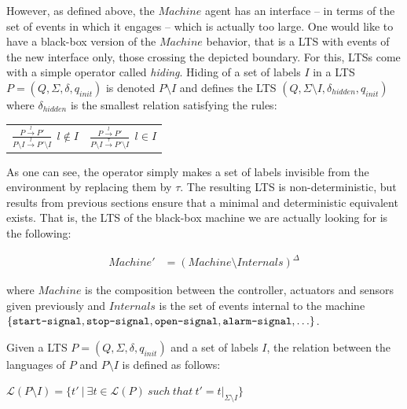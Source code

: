 However, as defined above, the $Machine$ agent has an interface -- in terms of the set of events in which it engages -- which is actually too large. One would like to have a black-box version of the $Machine$ behavior, that is a LTS with events of the new interface only, those crossing the depicted boundary. For this, LTSs come with a simple operator called \emph{hiding}. Hiding of a set of labels $I$ in a LTS $P = (Q,\Sigma,\delta,q_{init})$ is denoted $P \setminus I$ and defines the LTS $(Q,\Sigma \setminus I,\delta_{hidden},q_{init})$ where $\delta_{hidden}$ is the smallest relation satisfying the rules:

\begin{center}
\begin{tabular}{cc}
$\frac{\displaystyle P \stackrel{l}{\longrightarrow} P'}{\displaystyle P \setminus I \stackrel{l}{\longrightarrow} P' \setminus I}~~l \notin I$ & 
$\frac{\displaystyle P \stackrel{l}{\longrightarrow} P'}{\displaystyle P \setminus I \stackrel{\tau}{\longrightarrow} P' \setminus I}~~l \in I$ \\
\end{tabular}
\end{center}

As one can see, the operator simply makes a set of labels invisible from the environment by replacing them by $\tau$. The resulting LTS is non-deterministic, but results from previous sections ensure that a minimal and deterministic equivalent exists. That is, the LTS of the black-box machine we are actually looking for is the following:

\vspace{-0.8cm}
\begin{align*}
Machine' &= (Machine \setminus Internals)^\Delta
\end{align*}
\vspace{-0.8cm}

\noindent where $Machine$ is the composition between the controller, actuators and sensors given previously and $Internals$ is the set of events internal to the machine $\{\texttt{start-signal}, \texttt{stop-signal}, \texttt{open-signal}, \texttt{alarm-signal}, \ldots\}$. 

Given a LTS $P = (Q,\Sigma,\delta,q_{init})$ and a set of labels $I$, the relation between the languages of $P$ and $P \setminus I$ is defined as follows:

\begin{center}
$\mathcal{L}(P \setminus I) = \{ t'~|~\exists t \in \mathcal{L}(P)~such~that~t' = t|_{\Sigma \setminus I}\}$
\end{center}

